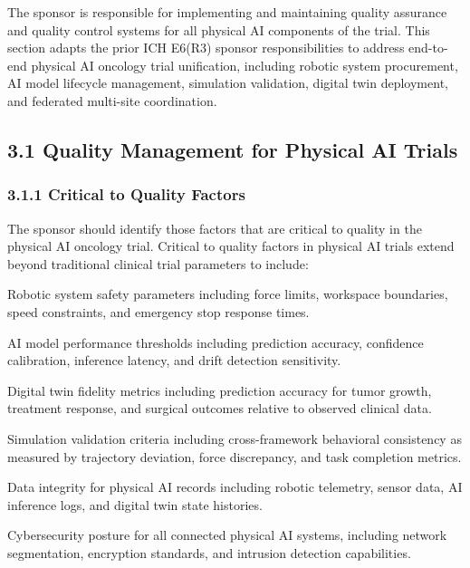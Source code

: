 \documentclass[11pt]{article}
\begin{document}
The sponsor is responsible for implementing and maintaining quality assurance and quality control systems for all physical AI components of the trial. This section adapts the prior ICH E6(R3) sponsor responsibilities to address end-to-end physical AI oncology trial unification, including robotic system procurement, AI model lifecycle management, simulation validation, digital twin deployment, and federated multi-site coordination.

\subsection{3.1 Quality Management for Physical AI Trials}

\subsubsection{3.1.1 Critical to Quality Factors}

The sponsor should identify those factors that are critical to quality in the physical AI oncology trial. Critical to quality factors in physical AI trials extend beyond traditional clinical trial parameters to include:

\begin{description}[leftmargin=2.5cm,style=sameline]

\item[(a)] Robotic system safety parameters including force limits, workspace boundaries, speed constraints, and emergency stop response times.

\item[(b)] AI model performance thresholds including prediction accuracy, confidence calibration, inference latency, and drift detection sensitivity.

\item[(c)] Digital twin fidelity metrics including prediction accuracy for tumor growth, treatment response, and surgical outcomes relative to observed clinical data.

\item[(d)] Simulation validation criteria including cross-framework behavioral consistency as measured by trajectory deviation, force discrepancy, and task completion metrics.

\item[(e)] Data integrity for physical AI records including robotic telemetry, sensor data, AI inference logs, and digital twin state histories.

\item[(f)] Cybersecurity posture for all connected physical AI systems, including network segmentation, encryption standards, and intrusion detection capabilities.

\end{description}
\end{document}
